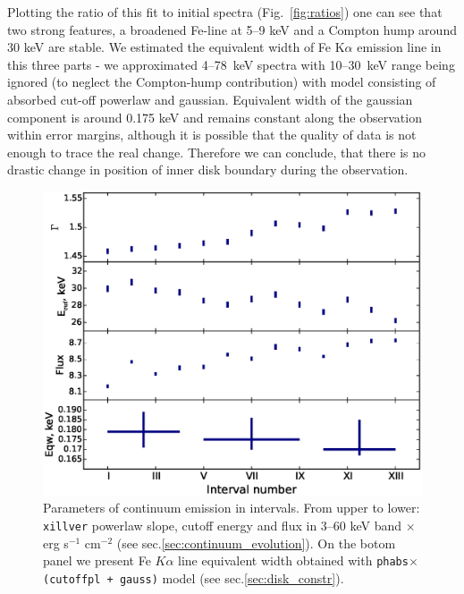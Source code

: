 \documentclass[a4paper,fleqn,usenatbib]{mnras}
\begin{document}
Plotting the ratio of this fit to initial spectra (Fig.~\ref{fig:ratios}) one can see that two strong features, a broadened Fe-line at 5--9 keV and a Compton hump around 30 keV are stable. 
We estimated the equivalent width of  Fe K$\alpha$ emission line in this three parts - we approximated 4--78~keV spectra with 10--30~keV range being ignored (to neglect the Compton-hump contribution) with model consisting of absorbed cut-off powerlaw and gaussian. 
Equivalent width of the gaussian component is around 0.175 keV and remains constant along the observation within error margins, although it is possible that the quality of data is not enough to trace the real change.
Therefore we can conclude, that there is no drastic change in position of inner disk boundary during the observation. 

\begin{figure}
\centerline{\includegraphics[width=\linewidth]{intspe_v04.eps}}
\caption{Parameters of continuum emission in intervals. From upper to lower: \texttt{xillver} powerlaw slope, cutoff energy and  flux in 3--60 keV band $\times$\, erg s$^{-1}$ cm$^{-2}$ (see sec.\ref{sec:continuum_evolution}). On the botom panel we present Fe $K\alpha$ line equivalent width obtained with \texttt{phabs$\times$(cutoffpl + gauss)} model (see sec.\ref{sec:disk_constr}).} 
\label{fig:intspe}
\end{figure}  
\end{document}
